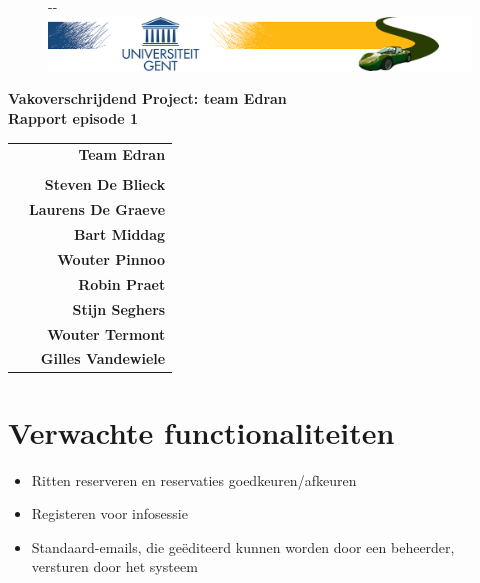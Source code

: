 \documentclass[11pt,a4paper,oneside]{article}
\begin{document}
\begin{titlepage}

\thispagestyle{fancy}
\fancyhf{}
\fancyfoot[L]{}
\begin{figure}[!ht]
  \begin{adjustwidth}{-\oddsidemargin-1in}{-\rightmargin}
    \centering
    \includegraphics[width=\paperwidth]{banner}
  \end{adjustwidth}
\end{figure}
\vspace{-0.2em}
\begin{center}
\vspace{5cm}
\Huge \textbf{Vakoverschrijdend Project: team Edran\\ Rapport episode 1}\\
\vspace{6.0cm}
\large
\begin{tabular}{L! {} R}
& {\LARGE\bf Team Edran} \\
& \\
& {\bf Steven De Blieck} \\
& {\bf Laurens De Graeve} \\
& {\bf Bart Middag} \\
& {\bf Wouter Pinnoo} \\
& {\bf Robin Praet} \\
& {\bf Stijn Seghers} \\
& {\bf Wouter Termont} \\
& {\bf Gilles Vandewiele} \\
\end{tabular}
\end{center}
\end{titlepage}
\restoregeometry
\newpage

\fancyheadoffset[RO,LE]{0in}

\fancyfoot[L]{}
\fancyfoot[C]{\thepage}
\pagestyle{fancy}
\tableofcontents
\newpage
\part{Verwachte functionaliteiten}
\begin{itemize}
	\item Ritten reserveren en reservaties goedkeuren/afkeuren
	\item Registeren voor infosessie
	\item Standaard-emails, die ge\"{e}diteerd kunnen worden door een beheerder, versturen door het systeem
\end{itemize}
\end{document}
